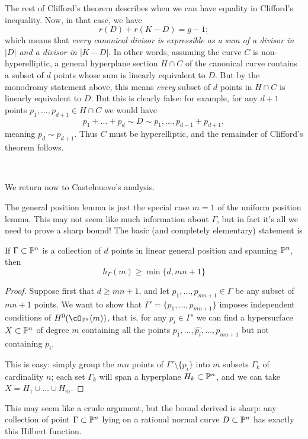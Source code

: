 The rest of Clifford's theorem describes when we can have equality in Clifford's inequality. Now, in that case, we have
$$
r(D) + r(K-D) = g-1;
$$
which means that \emph{every canonical divisor is expressible as a sum of a divisor in $|D|$ and a divisor in $|K-D|$}. In other words, assuming the curve $C$ is non-hyperelliptic, a general hyperplane section $H \cap C$ of the canonical curve contains a subset of $d$ points whose sum is linearly equivalent to $D$. But by the monodromy statement above, this means \emph{every} subset of $d$ points in $H \cap C$ is linearly equivalent to $D$. But this is clearly false: for example, for any $d+1$ points $p_1,\dots,p_{d+1} \in H \cap C$ we would have
$$
p_1 + \dots + p_d \sim D \sim p_1,\dots, p_{d-1} + p_{d+1},
$$
meaning $p_d \sim p_{d+1}$. Thus $C$ must be hyperelliptic, and the remainder of Clifford's theorem follows.

\

We return now to Castelnuovo's analysis.

The general position lemma is just the special case $m=1$ of the uniform position lemma. This may not seem like much information about $\Gamma$, but in fact it's all we need to prove a sharp bound! The basic (and completely elementary) statement is

\begin{proposition}
If $\Gamma \subset \PP^n$ is a collection of $d$ points in linear general position and spanning $\PP^n$, then 
$$
h_\Gamma(m) \geq \min\{d, mn+1\}
$$
\end{proposition}

\begin{proof}
Suppose first that $d \geq mn+1$, and let $p_1,\dots,p_{mn+1} \in \Gamma$ be any subset of $mn+1$ points. We want to show that $\Gamma' = \{p_1,\dots,p_{mn+1}\}$ imposes independent conditions of $H^0(\cO_{\PP^n}(m))$, that is, for any $p_i \in \Gamma'$ we can find a hypersurface $X \subset \PP^n$ of degree $m$ containing all the points $p_1,\dots, \hat{p_i},\dots,p_{mn+1}$ but not containing $p_i$.

This is easy: simply group the $mn$ points of $\Gamma' \setminus \{p_i\}$ into $m$ subsets $\Gamma_k$ of cardinality $n$; each set $\Gamma_k$ will span a hyperplane $H_k \subset \PP^n$, and we can take $X = H_1 \cup \dots \cup H_m$. 
\end{proof}

This may seem like a crude argument, but the bound derived is sharp: any collection of point $\Gamma \subset \PP^n$ lying on a rational normal curve $D \subset \PP^n$ has exactly this Hilbert function.

